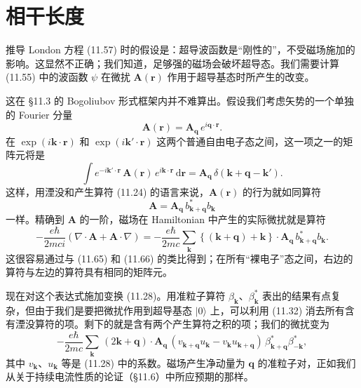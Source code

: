 \section{相干长度}

推导 London 方程 (11.57) 时的假设是：超导波函数是“刚性的”，不受磁场施加的影响。这显然不正确；我们知道，足够强的磁场会破坏超导态。我们需要计算 (11.55) 中的波函数 $\psi$ 在微扰 $\mathbf{A}(\mathbf{r})$ 作用于超导基态时所产生的改变。

这在 §11.3 的 Bogoliubov 形式框架内并不难算出。假设我们考虑矢势的一个单独的 Fourier 分量
\begin{equation*}
\mathbf{A}(\mathbf{r}) = \mathbf{A}_{\mathbf{q}}\,e^{i\mathbf{q}\cdot\mathbf{r}}. \tag{11.64}
\end{equation*}
在 $\exp(i\mathbf{k}\cdot\mathbf{r})$ 和 $\exp(i\mathbf{k}'\cdot\mathbf{r})$ 这两个普通自由电子态之间，这一项之一的矩阵元将是
\begin{equation*}
\int e^{-i\mathbf{k}'\cdot\mathbf{r}}\,\mathbf{A}(\mathbf{r})\,e^{i\mathbf{k}\cdot\mathbf{r}}\,\mathrm{d}\mathbf{r} = \mathbf{A}_{\mathbf{q}}\,\delta(\mathbf{k}+\mathbf{q}-\mathbf{k}'). \tag{11.65}
\end{equation*}
这样，用湮没和产生算符 (11.24) 的语言来说，$\mathbf{A}(\mathbf{r})$ 的行为就如同算符
\begin{equation*}
\mathbf{A} = \mathbf{A}_{\mathbf{q}}\,b_{\mathbf{k}+\mathbf{q}}^{*}b_{\mathbf{k}} \tag{11.66}
\end{equation*}
一样。精确到 $\mathbf{A}$ 的一阶，磁场在 Hamiltonian 中产生的实际微扰就是算符
\begin{equation*}
-\frac{e\hbar}{2mci}\left(\nabla\cdot\mathbf{A}+\mathbf{A}\cdot\nabla\right) = -\frac{e\hbar}{2mc}\sum_{\mathbf{k}}\left\{(\mathbf{k}+\mathbf{q})+\mathbf{k}\right\}\cdot\mathbf{A}_{\mathbf{q}}\,b_{\mathbf{k}+\mathbf{q}}^{*}b_{\mathbf{k}}. \tag{11.67}
\end{equation*}
这很容易通过与 (11.65) 和 (11.66) 的类比得到；在所有“裸电子”态之间，右边的算符与左边的算符具有相同的矩阵元。

现在对这个表达式施加变换 (11.28)。用准粒子算符 $\beta_{\mathbf{k}}$、$\beta_{\mathbf{k}}^{*}$ 表出的结果有点复杂，但由于我们是要把微扰作用到超导基态 $|0\rangle$ 上，可以利用 (11.32) 消去所有含有湮没算符的项。剩下的就是含有两个产生算符之积的项；我们的微扰变为
\begin{equation*}
-\frac{e\hbar}{2mc}\sum_{\mathbf{k}}\,(2\mathbf{k}+\mathbf{q})\cdot\mathbf{A}_{\mathbf{q}}\,(v_{\mathbf{k}+\mathbf{q}}u_{\mathbf{k}} - v_{\mathbf{k}}u_{\mathbf{k}+\mathbf{q}})\,\beta_{\mathbf{k}+\mathbf{q}}^{*}\beta_{-\mathbf{k}}^{*}, \tag{11.68}
\end{equation*}
其中 $v_{\mathbf{k}}$、$u_{\mathbf{k}}$ 等是 (11.28) 中的系数。磁场产生净动量为 $\mathbf{q}$ 的准粒子对，正如我们从关于持续电流性质的论证（§11.6）中所应预期的那样。

